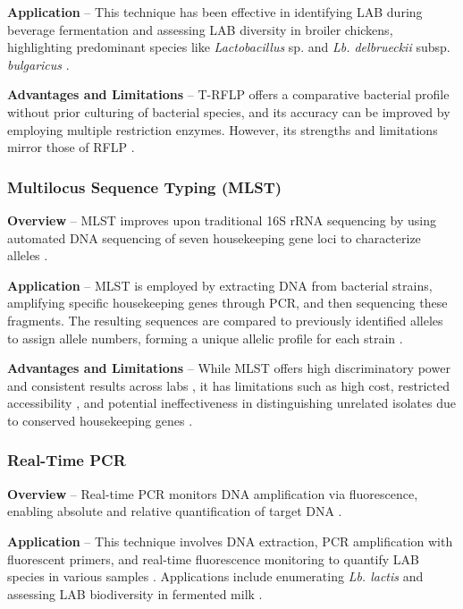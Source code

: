 \textbf{Application} – This technique has been effective in identifying LAB during beverage fermentation and assessing LAB diversity in broiler chickens, highlighting predominant species like \textit{Lactobacillus} sp. and \textit{Lb. delbrueckii} subsp. \textit{bulgaricus} \cite*{L4-MolTyping}.

\textbf{Advantages and Limitations} – T-RFLP offers a comparative bacterial profile without prior culturing of bacterial species, and its accuracy can be improved by employing multiple restriction enzymes. However, its strengths and limitations mirror those of RFLP \cite*{L4-MolTyping}.

\subsubsection{Multilocus Sequence Typing (MLST)}
\textbf{Overview} – MLST improves upon traditional 16S rRNA sequencing by using automated DNA sequencing of seven housekeeping gene loci to characterize alleles \cite*{L4-MolTyping}.

\textbf{Application} – MLST is employed by extracting DNA from bacterial strains, amplifying specific housekeeping genes through PCR, and then sequencing these fragments. The resulting sequences are compared to previously identified alleles to assign allele numbers, forming a unique allelic profile for each strain \cite*{L4-MolTyping}.

\textbf{Advantages and Limitations} – While MLST offers high discriminatory power and consistent results across labs \cite*{L4-MolTyping}, it has limitations such as high cost, restricted accessibility \cite*{L4-MolTyping}, and potential ineffectiveness in distinguishing unrelated isolates due to conserved housekeeping genes \cite*{L4-MolTyping}.

\subsubsection{Real-Time PCR}
\textbf{Overview} – Real-time PCR monitors DNA amplification via fluorescence, enabling absolute and relative quantification of target DNA \cite*{L4-MolTyping}.

\textbf{Application} – This technique involves DNA extraction, PCR amplification with fluorescent primers, and real-time fluorescence monitoring to quantify LAB species in various samples \cite*{L4-MolTyping}. Applications include enumerating \textit{Lb. lactis} and assessing LAB biodiversity in fermented milk \cite*{L4-MolTyping}.


